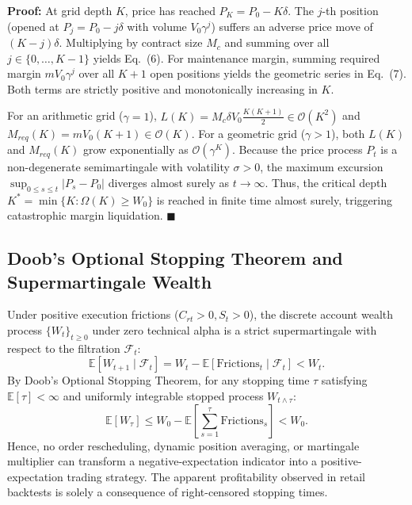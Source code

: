 \documentclass[11pt,a4paper]{article}
\begin{document}
\textbf{Proof:} At grid depth $K$, price has reached $P_K = P_0 - K \delta$. The $j$-th position (opened at $P_j = P_0 - j \delta$ with volume $V_0 \gamma^j$) suffers an adverse price move of $(K - j)\delta$. Multiplying by contract size $M_c$ and summing over all $j \in \{0, \dots, K-1\}$ yields Eq.~(6). For maintenance margin, summing required margin $m V_0 \gamma^j$ over all $K+1$ open positions yields the geometric series in Eq.~(7). Both terms are strictly positive and monotonically increasing in $K$. 

For an arithmetic grid ($\gamma = 1$), $L(K) = M_c \delta V_0 \frac{K(K+1)}{2} \in \mathcal{O}(K^2)$ and $M_{req}(K) = m V_0 (K+1) \in \mathcal{O}(K)$. For a geometric grid ($\gamma > 1$), both $L(K)$ and $M_{req}(K)$ grow exponentially as $\mathcal{O}(\gamma^K)$. Because the price process $P_t$ is a non-degenerate semimartingale with volatility $\sigma > 0$, the maximum excursion $\sup_{0 \le s \le t} |P_s - P_0|$ diverges almost surely as $t \to \infty$. Thus, the critical depth $K^* = \min \{K : \Omega(K) \ge W_0\}$ is reached in finite time almost surely, triggering catastrophic margin liquidation. $\blacksquare$

\subsection{Doob's Optional Stopping Theorem and Supermartingale Wealth}
Under positive execution frictions ($C_{rt} > 0, S_t > 0$), the discrete account wealth process $\{W_t\}_{t \ge 0}$ under zero technical alpha is a strict supermartingale with respect to the filtration $\mathcal{F}_t$:
\begin{equation}
\mathbb{E}[W_{t+1} \mid \mathcal{F}_t] = W_t - \mathbb{E}[\text{Frictions}_t \mid \mathcal{F}_t] < W_t.
\end{equation}
By Doob's Optional Stopping Theorem, for any stopping time $\tau$ satisfying $\mathbb{E}[\tau] < \infty$ and uniformly integrable stopped process $W_{t \wedge \tau}$:
\begin{equation}
\mathbb{E}[W_{\tau}] \le W_0 - \mathbb{E}\left[ \sum_{s=1}^{\tau} \text{Frictions}_s \right] < W_0.
\end{equation}
Hence, no order rescheduling, dynamic position averaging, or martingale multiplier can transform a negative-expectation indicator into a positive-expectation trading strategy. The apparent profitability observed in retail backtests is solely a consequence of right-censored stopping times.
\end{document}
